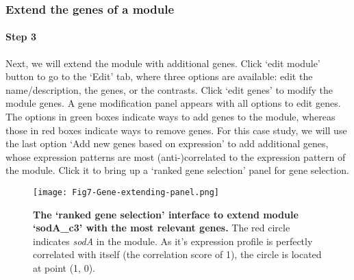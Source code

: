 \subsubsection{Extend the genes of a module}

\begin{small} %

\paragraph{Step 3} Next, we will extend the module with additional genes.
Click `edit module' button to go to the `Edit' tab, where three options are
available: edit the name/description, the genes, or the contrasts. Click `edit
genes' to modify the module genes. A gene modification panel appears with all
options to edit genes.  The options in green boxes indicate ways to add genes
to the module, whereas those in red boxes indicate ways to remove genes. 
%
For this case study, we will use the last option `Add new genes based on
expression' to add additional genes, whose expression patterns are most
(anti-)correlated to the expression pattern of the module.  Click it to bring
up a `ranked gene selection' panel for gene selection.

\begin{figure}[b]
	\centering
  	\texttt{[image: Fig7-Gene-extending-panel.png]}
	\caption[COLOMBOS `ranked gene selection' interface]{
	\textbf{The `ranked gene selection' interface to extend module `sodA\_c3' 
	with the most relevant genes.} 
	The red circle indicates \textit{sodA} in the module. As it's expression 
	profile is perfectly correlated with itself (the correlation score of 1), 
	the circle is located at point (1, 0).}
	\label{fig:colombos-gene-extend}
\end{figure}


\end{small}
